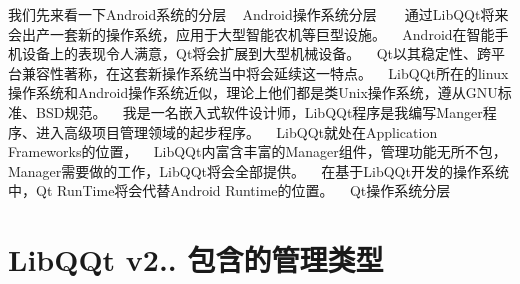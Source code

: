 我们先来看一下\+Android系统的分层 ~\newline
Android操作系统分层 ~\newline
 ~\newline
 通过\+Lib\+Q\+Qt将来会出产一套新的操作系统，应用于大型智能农机等巨型设施。 ~\newline
Android在智能手机设备上的表现令人满意，\+Qt将会扩展到大型机械设备。 ~\newline
Qt以其稳定性、跨平台兼容性著称，在这套新操作系统当中将会延续这一特点。 ~\newline
Lib\+Q\+Qt所在的linux操作系统和\+Android操作系统近似，理论上他们都是类\+Unix操作系统，遵从\+G\+N\+U标准、\+B\+S\+D规范。 ~\newline
 我是一名嵌入式软件设计师，\+Lib\+Q\+Qt程序是我编写\+Manger程序、进入高级项目管理领域的起步程序。 ~\newline
Lib\+Q\+Qt就处在\+Application Frameworks的位置， ~\newline
Lib\+Q\+Qt内富含丰富的\+Manager组件，管理功能无所不包，\+Manager需要做的工作，\+Lib\+Q\+Qt将会全部提供。 ~\newline
 在基于\+Lib\+Q\+Qt开发的操作系统中，\+Qt Run\+Time将会代替\+Android Runtime的位置。 ~\newline
Qt操作系统分层 ~\newline
 ~\newline


\section*{Lib\+Q\+Qt v2.. 包含的管理类型}


